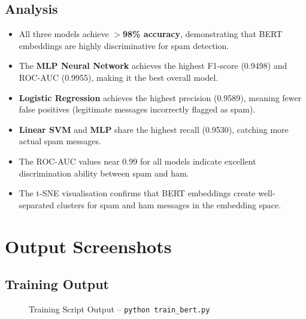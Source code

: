 \documentclass[12pt,a4paper]{article}
\begin{document}
\subsection{Analysis}
\begin{itemize}
    \item All three models achieve \textbf{$>$98\% accuracy}, demonstrating that BERT embeddings are highly discriminative for spam detection.
    \item The \textbf{MLP Neural Network} achieves the highest F1-score (0.9498) and ROC-AUC (0.9955), making it the best overall model.
    \item \textbf{Logistic Regression} achieves the highest precision (0.9589), meaning fewer false positives (legitimate messages incorrectly flagged as spam).
    \item \textbf{Linear SVM} and \textbf{MLP} share the highest recall (0.9530), catching more actual spam messages.
    \item The ROC-AUC values near 0.99 for all models indicate excellent discrimination ability between spam and ham.
    \item The t-SNE visualisation confirms that BERT embeddings create well-separated clusters for spam and ham messages in the embedding space.
\end{itemize}

\section{Output Screenshots}


\subsection{Training Output}
\begin{figure}[H]
\centering
{}
\caption{Training Script Output -- \texttt{python train\_bert.py}}
\end{figure}
\end{document}
